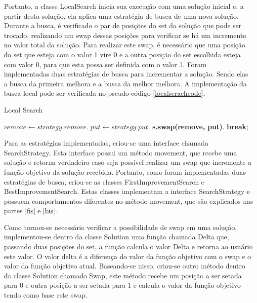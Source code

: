 \documentclass[12pt]{article}
\begin{document}
Portanto, a classe LocalSearch inicia sua execução com uma solução inicial e, a partir desta solução, ela aplica uma estratégia de busca de uma nova solução. Durante a busca, é verificado o par de posições do set da solução que pode ser trocado, realizando um swap dessas posições para verificar se há um incremento no valor total da solução. Para realizar este swap, é necessário que uma posição do set que esteja com o valor 1 vire 0 e a outra posição do set escolhida esteja com valor 0, para que esta possa ser definida com o valor 1. Foram implementadas duas estratégias de busca para incrementar a solução. Sendo elas a busca da primeira melhora e a busca da melhor melhora. A implementação da busca local pode ser verificada no pseudo-código \ref{localserachcode}.

\begin{algorithm}
    \caption{Local Search}\label{euclid}
    \begin{algorithmic}[1]
                    \State $remove \gets strategy.remove$.
                    \State $put \gets strategy.put$.
                    \State \textbf{s.swap(remove, put)}.
                    \Else \State \textbf{break};
                \EndIf
            \EndWhile
        \EndProcedure
    \end{algorithmic}
\label{localserachcode}
\end{algorithm}

Para as estratégias implementadas, criou-se uma interface chamada SearchStrategy. Esta interface possui um método movement, que recebe uma solução e retorna verdadeiro caso seja possível realizar um swap que incremente a função objetivo da solução recebida. Portanto, como foram implementadas duas estratégias de busca, criou-se as classes FirstImprovementSearch e BestImprovementSearch. Estas classes implementam a interface SearchStrategy e possuem comportamentos diferentes no método movement, que são explicados nas partes \ref{fis} e \ref{bis}.

Como tornou-se necessário verificar a possibilidade de swap em uma solução, implementou-se dentro da classe Solution uma função chamada Delta que, passando duas posições do set, a função calcula o valor Delta e retorna ao usuário este valor. O valor delta é a diferença do valor da função objetivo com o swap e o valor da função objetivo atual. Baseando-se nisso, criou-se outro método dentro da classe Solution chamado Swap, este método recebe um posição a ser setada para 0 e outra posição a ser setada para 1 e calcula o valor da função objetivo tendo como base este swap. 
\end{document}
